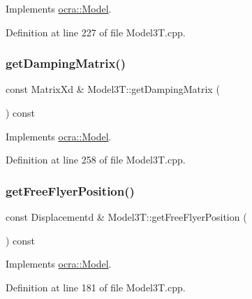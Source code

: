 Implements \hyperlink{classocra_1_1Model_a567e950be5868080c250c40d8fc0c0ce}{ocra\+::\+Model}.



Definition at line 227 of file Model3\+T.\+cpp.

\hypertarget{classModel3T_a5ed6794462c63bdd1eeabbfa221e2ef6}{}\label{classModel3T_a5ed6794462c63bdd1eeabbfa221e2ef6} 
\subsubsection{\texorpdfstring{get\+Damping\+Matrix()}{getDampingMatrix()}}
{\footnotesize\ttfamily const Matrix\+Xd \& Model3\+T\+::get\+Damping\+Matrix (\begin{DoxyParamCaption}{ }\end{DoxyParamCaption}) const\hspace{0.3cm}{\ttfamily [virtual]}}



Implements \hyperlink{classocra_1_1Model_adfbe3160558dd221e7e91e2aad4d5089}{ocra\+::\+Model}.



Definition at line 258 of file Model3\+T.\+cpp.

\hypertarget{classModel3T_ab9a2a5644b40341af54e408dd8d1b0de}{}\label{classModel3T_ab9a2a5644b40341af54e408dd8d1b0de} 
\subsubsection{\texorpdfstring{get\+Free\+Flyer\+Position()}{getFreeFlyerPosition()}}
{\footnotesize\ttfamily const Displacementd \& Model3\+T\+::get\+Free\+Flyer\+Position (\begin{DoxyParamCaption}{ }\end{DoxyParamCaption}) const\hspace{0.3cm}{\ttfamily [virtual]}}



Implements \hyperlink{classocra_1_1Model_a7549d8ca32c46a84ea4799730a81dae2}{ocra\+::\+Model}.



Definition at line 181 of file Model3\+T.\+cpp.

\hypertarget{classModel3T_aa2b2a35af047f4fd539131e87ee3af2a}{}\label{classModel3T_aa2b2a35af047f4fd539131e87ee3af2a} 

